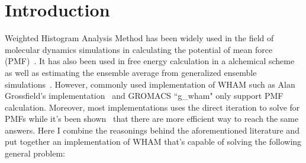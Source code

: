\section{Introduction}\label{sec:intro}

Weighted Histogram Analysis Method has been widely used in the field of 
molecular dynamics simulations in calculating the potential of mean force
(PMF)~\cite{Kumar1992,Roux1995275}.
It has also been used in free energy calculation in a alchemical scheme~\cite{Kumar1992} as 
well as estimating the ensemble average from generalized ensemble simulations~\cite{Chodera2007}.
However, commonly used implementation of WHAM such as Alan Grossfield's 
implementation~\cite{wham205} and GROMACS ``g\_wham" only support PMF calculation.
Moreover, most implementations uses the direct iteration to solve for PMFs 
while it's been shown~\cite{Zhu2012} that there are more efficient way to 
reach the same answers. Here I combine the reasonings behind the aforementioned
literature and put together an implementation of WHAM that's capable of solving 
the following general problem:

